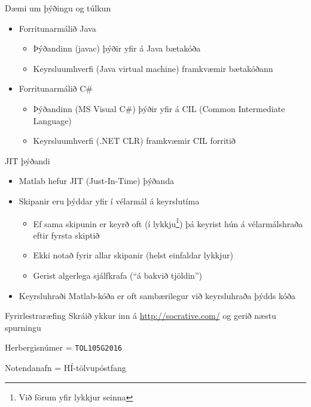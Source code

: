 \documentclass[handout]{beamer}
\begin{document}
\begin{frame}{Dæmi um þýðingu og túlkun}
\begin{itemize}
 \item Forritunarmálið Java
 \begin{itemize}
  \item Þýðandinn (javac) þýðir yfir á Java bætakóða
  \item Keyrsluumhverfi (Java virtual machine) framkvæmir bætakóðann
 \end{itemize}
\end{itemize}
\begin{itemize}
 \item Forritunarmálið C\#
 \begin{itemize}
  \item Þýðandinn (MS Visual C\#) þýðir yfir á CIL (Common Intermediate Language)
  \item Keyrsluumhverfi (.NET CLR) framkvæmir CIL forritið
 \end{itemize}
\end{itemize}
\end{frame}

\begin{frame}{JIT þýðandi}
\begin{itemize}
 \item Matlab hefur JIT (Just-In-Time) þýðanda
 \item Skipanir eru þýddar yfir í vélarmál á keyrslutíma
 \begin{itemize}
  \item Ef sama skipunin er keyrð oft (í lykkju\footnote{Við förum yfir lykkjur seinna}) þá keyrist hún á vélarmálshraða eftir fyrsta skiptið
  \item Ekki notað fyrir allar skipanir (helst einfaldar lykkjur)
  \item Gerist algerlega sjálfkrafa (``á bakvið tjöldin'')
 \end{itemize}
 \item Keyrsluhraði Matlab-kóða er oft sambærilegur við keyrsluhraða þýdds kóða
\end{itemize}
\end{frame}

\begin{frame}{Fyrirlestraræfing}
Skráið ykkur inn á \url{http://socrative.com/} og gerið næstu spurningu

Herbergisnúmer = \texttt{TOL105G2016}

Notendanafn = HÍ-tölvupóstfang
\end{frame}
\end{document}
